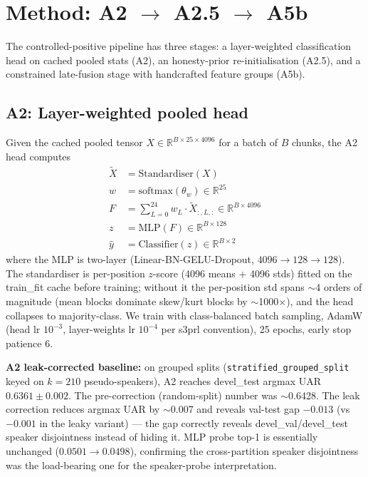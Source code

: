 \section{Method: A2 $\rightarrow$ A2.5 $\rightarrow$ A5b}
\label{sec:method}

The controlled-positive pipeline has three stages: a layer-weighted classification head on cached pooled stats (A2), an honesty-prior re-initialisation (A2.5), and a constrained late-fusion stage with handcrafted feature groups (A5b).

\subsection{A2: Layer-weighted pooled head}
\label{ssec:a2}

Given the cached pooled tensor $X \in \mathbb{R}^{B \times 25 \times 4096}$ for a batch of $B$ chunks, the A2 head computes
\begin{align}
\tilde{X} &= \mathrm{Standardiser}(X) \\
w &= \mathrm{softmax}(\theta_w) \in \mathbb{R}^{25} \\
F &= \sum_{L=0}^{24} w_L \cdot \tilde{X}_{:, L, :} \in \mathbb{R}^{B \times 4096} \\
z &= \mathrm{MLP}(F) \in \mathbb{R}^{B \times 128} \\
\hat{y} &= \mathrm{Classifier}(z) \in \mathbb{R}^{B \times 2}
\end{align}
where the MLP is two-layer (Linear-BN-GELU-Dropout, $4096{\to}128{\to}128$). The standardiser is per-position $z$-score (4096 means + 4096 stds) fitted on the train\_fit cache before training; without it the per-position std spans $\sim$4 orders of magnitude (mean blocks dominate skew/kurt blocks by $\sim$1000$\times$), and the head collapses to majority-class. We train with class-balanced batch sampling, AdamW (head lr $10^{-3}$, layer-weights lr $10^{-4}$ per s3prl convention), 25 epochs, early stop patience 6.

\textbf{A2 leak-corrected baseline:} on grouped splits (\texttt{stratified\_grouped\_split} keyed on $k{=}210$ pseudo-speakers), A2 reaches devel\_test argmax UAR $0.6361 \pm 0.002$. The pre-correction (random-split) number was $\sim$0.6428. The leak correction reduces argmax UAR by $\sim$0.007 and reveals val-test gap $-0.013$ (vs $-0.001$ in the leaky variant) — the gap correctly reveals devel\_val/devel\_test speaker disjointness instead of hiding it. MLP probe top-1 is essentially unchanged ($0.0501 \to 0.0498$), confirming the cross-partition speaker disjointness was the load-bearing one for the speaker-probe interpretation.

